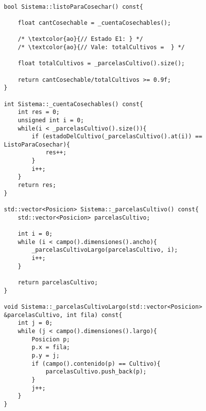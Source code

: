 \begin{lstlisting}

bool Sistema::listoParaCosechar() const{
     
    float cantCosechable = _cuentaCosechables();
	
	/* \textcolor{ao}{// Estado E1: } */
    /* \textcolor{ao}{// Vale: totalCultivos =  } */

    float totalCultivos = _parcelasCultivo().size();
    
    return cantCosechable/totalCultivos >= 0.9f;
}

int Sistema::_cuentaCosechables() const{
    int res = 0;
    unsigned int i = 0;
    while(i < _parcelasCultivo().size()){
        if (estadoDelCultivo(_parcelasCultivo().at(i)) == ListoParaCosechar){
            res++;
        }
        i++;
    }
    return res;
}

std::vector<Posicion> Sistema::_parcelasCultivo() const{
    std::vector<Posicion> parcelasCultivo;

    int i = 0;
    while (i < campo().dimensiones().ancho){
        _parcelasCultivoLargo(parcelasCultivo, i);
        i++;
    }

    return parcelasCultivo;
}

void Sistema::_parcelasCultivoLargo(std::vector<Posicion> &parcelasCultivo, int fila) const{
    int j = 0;
    while (j < campo().dimensiones().largo){
        Posicion p;
        p.x = fila;
        p.y = j;
        if (campo().contenido(p) == Cultivo){
            parcelasCultivo.push_back(p);
        }
        j++;
    }
}


\end{lstlisting}